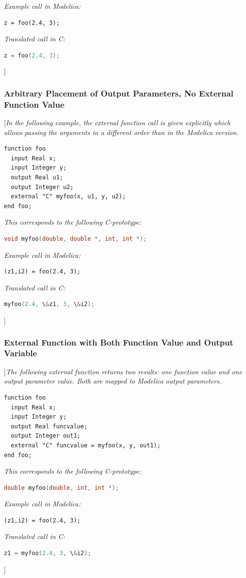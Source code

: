 \documentclass[10pt,a4paper]{report}
\def\doublelabel#1{\label{#1}\hypertarget{#1}{}}
\begin{document}
\emph{Example call in Modelica: }
\begin{lstlisting}[language=modelica]
z = foo(2.4, 3);
\end{lstlisting}
\emph{Translated call in C: }
\begin{lstlisting}[language=C]
z = foo(2.4, 3);
\end{lstlisting}
{]}

\subsubsection{Arbitrary Placement of Output Parameters, No External Function Value}\doublelabel{arbitrary-placement-of-output-parameters-no-external-function-value}

{[}\emph{In the following example, the external function call is given
explicitly which allows passing the arguments in a different order than
in the Modelica version.}

\begin{lstlisting}[language=modelica]
function foo
  input Real x;
  input Integer y;
  output Real u1;
  output Integer u2;
  external "C" myfoo(x, u1, y, u2);
end foo;
\end{lstlisting}
\emph{This corresponds to the following C-prototype:}
\begin{lstlisting}[language=C]
void myfoo(double, double *, int, int *);
\end{lstlisting}
\emph{Example call in Modelica: }
\begin{lstlisting}[language=modelica]
(z1,i2) = foo(2.4, 3);
\end{lstlisting}
\emph{Translated call in C: }
\begin{lstlisting}[language=C]
myfoo(2.4, \&z1, 3, \&i2);
\end{lstlisting}
{]}

\subsubsection{External Function with Both Function Value and Output Variable}\doublelabel{external-function-with-both-function-value-and-output-variable}

{[}\emph{The following external function returns two results: one
function value and one output parameter value. Both are mapped to
Modelica output parameters.}

\begin{lstlisting}[language=modelica]
function foo
  input Real x;
  input Integer y;
  output Real funcvalue;
  output Integer out1;
  external "C" funcvalue = myfoo(x, y, out1);
end foo;
\end{lstlisting}
\emph{This corresponds to the following C-prototype:}
\begin{lstlisting}[language=C]
double myfoo(double, int, int *);
\end{lstlisting}
\emph{Example call in Modelica: }
\begin{lstlisting}[language=modelica]
(z1,i2) = foo(2.4, 3);
\end{lstlisting}
\emph{Translated call in C:}
\begin{lstlisting}[language=C]
z1 = myfoo(2.4, 3, \&i2);
\end{lstlisting}
{]}
\end{document}
